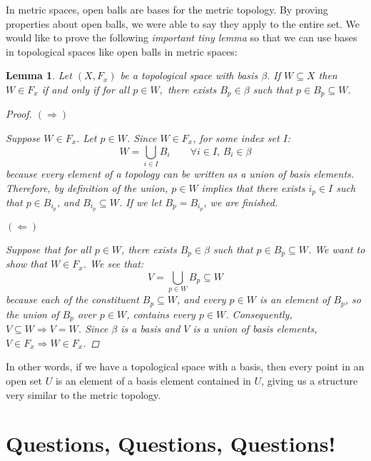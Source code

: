 \documentclass[reqno]{amsart}
\newtheorem{lemma}[theorem]{Lemma}
\begin{document}
In metric spaces, open balls are bases for the metric topology. By proving properties about open balls, we were able to say they apply to the entire set. We would like to prove the following \emph{important tiny lemma} so that we can use bases in topological spaces like open balls in metric spaces:
\begin{lemma}
Let $(X,F_x)$ be a topological space with basis $\beta$. If $W\subseteq X$ then $W\in F_x$ if and only if for all $p\in W,$ there exists $B_p\in\beta$ such that $p\in B_p\subseteq W$. 

\begin{proof}
$(\Rightarrow)$

Suppose $W\in F_x$. Let $p\in W$. Since $W\in F_x$, for some index set $I$:
\[W = \bigcup_{i\in I}B_i \qquad \forall i\in I,\,B_i\in \beta\]
because every element of a topology can be written as a union of basis elements.
Therefore, by definition of the union, $p\in W$ implies that there exists $i_p\in I$ such that $p\in B_{i_p}$, and $B_{i_p}\subseteq W$. If we let $B_p = B_{i_p}$, we are finished.

$(\Leftarrow)$

Suppose that for all $p\in W$, there exists $B_p\in \beta$ such that $p\in B_p\subseteq W$. We want to show that $W\in F_x$. We see that:
\[V = \bigcup_{p\in W}B_p\subseteq W\]
because each of the constituent $B_p\subseteq W$, and every $p\in W$ is an element of $B_p$, so the union of $B_p$ over $p\in W$, contains every $p\in W$. Consequently, $V\subseteq W \Rightarrow V=W$. Since $\beta$ is a basis and $V$ is a union of basis elements, $V\in F_x \Rightarrow W\in F_x$. 
\end{proof}
\end{lemma}
In other words, if we have a topological space with a basis, then every point in an open set $U$ is an element of a basis element contained in $U$, giving us a structure very similar to the metric topology.

\section{Questions, Questions, Questions!}
\end{document}
